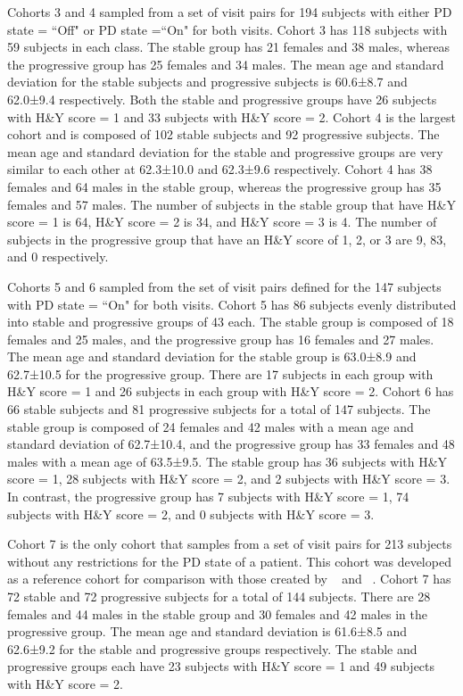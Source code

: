 \documentclass[10pt,letterpaper]{article}
\begin{document}
Cohorts 3 and 4 sampled from a set of visit pairs for 194 subjects with either PD state = ``Off" or PD state =``On" for both visits. Cohort 3 has 118 subjects with 
59 subjects in each class. The stable group has 21 females and 38 males, whereas the progressive group has 25 females and 34 males. The mean age and standard deviation for the stable 
subjects and progressive subjects is 60.6±8.7 and 62.0±9.4 respectively. Both the stable and progressive groups have 26 subjects with H\&Y score = 1 and 33 subjects 
with H\&Y score = 2. Cohort 4 is the largest cohort and is composed of 102 stable subjects and 92 progressive subjects. The mean age and standard deviation for the 
stable and progressive groups are very similar to each other at 62.3±10.0 and 62.3±9.6 respectively. Cohort 4 has 38 females and 64 males in the stable group, whereas the 
progressive group has 35 females and 57 males. The number of subjects in the stable group that have H\&Y score = 1 is 64, H\&Y score = 2 is 34, and H\&Y score = 3 is 4. 
The number of subjects in the progressive group that have an H\&Y score of 1, 2, or 3 are 9, 83, and 0 respectively.

Cohorts 5 and 6 sampled from the set of visit pairs defined for the 147 subjects with PD state = ``On" for both visits. Cohort 5 has 86 subjects evenly distributed into stable 
and progressive groups of 43 each. The stable group is composed of 18 females and 25 males, and the progressive group has 16 females and 27 males. The mean age and standard 
deviation for the stable group is 63.0±8.9 and 62.7±10.5 for the progressive group. There are 17 subjects in each group with H\&Y score = 1 and 26 subjects in each group 
with H\&Y score = 2. Cohort 6 has 66 stable subjects and 81 progressive subjects for a total of 147 subjects. The stable group is composed of 24 females and 42 males with a mean 
age and standard deviation of 62.7±10.4, and the progressive group has 33 females and 48 males with a mean age of 63.5±9.5. The stable group has 36 subjects with H\&Y score = 1, 28 subjects 
with H\&Y score = 2, and 2 subjects with H\&Y score = 3. In contrast, the progressive group has 7 subjects with H\&Y score = 1, 74 subjects with H\&Y score = 2, and 0 subjects with 
H\&Y score = 3. 

Cohort 7 is the only cohort that samples from a set of visit pairs for 213 subjects without any restrictions for the PD state of a patient. This cohort was developed as a 
reference cohort for comparison with those created by ~\cite{shu2021predicting} and ~\cite{Arafe2023.05.05.539590}. Cohort 7 has 72 stable and 72 progressive subjects for a total 
of 144 subjects. There are 28 females and 44 males in the stable group and 30 females and 42 males in the progressive group. The mean age and standard deviation is 61.6±8.5 and 
62.6±9.2 for the stable and progressive groups respectively. The stable and progressive groups each have 23 subjects with H\&Y score = 1 and 49 subjects with H\&Y score = 2. 
\end{document}
